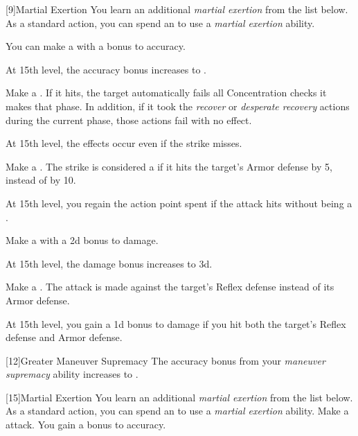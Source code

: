         [9]{Martial Exertion}
        You learn an additional \textit{martial exertion} from the list below.
        As a standard action, you can spend an  to use a \textit{martial exertion} ability.
        {
             You can make a  with a  bonus to accuracy.

            \par At 15th level, the accuracy bonus increases to .

             Make a .
            If it hits, the target automatically fails all Concentration checks it makes that phase.
            In addition, if it took the \textit{recover} or \textit{desperate recovery} actions during the current phase, those actions fail with no effect.

            \par At 15th level, the effects occur even if the strike misses.

             Make a .
            The strike is considered a  if it hits the target's Armor defense by 5, instead of by 10.

            \par At 15th level, you regain the action point spent if the attack hits without being a .

             Make a  with a \plus2d bonus to damage.

            \par At 15th level, the damage bonus increases to \plus3d.

             Make a .
            The attack is made against the target's Reflex defense instead of its Armor defense.

            \par At 15th level, you gain a \plus1d bonus to damage if you hit both the target's Reflex defense and Armor defense.
        }

        [12]{Greater Maneuver Supremacy} The accuracy bonus from your \textit{maneuver supremacy} ability increases to .

        [15]{Martial Exertion} 
        You learn an additional \textit{martial exertion} from the list below.
        As a standard action, you can spend an  to use a \textit{martial exertion} ability.
        {
             Make a  attack.
            You gain a  bonus to accuracy.
        }

